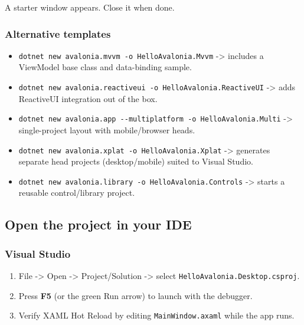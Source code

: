 A starter window appears. Close it when done.

\subsubsection{Alternative templates}\label{alternative-templates}

\begin{itemize}
\tightlist
\item
  \passthrough{\lstinline!dotnet new avalonia.mvvm -o HelloAvalonia.Mvvm!}
  -\textgreater{} includes a ViewModel base class and data-binding
  sample.
\item
  \passthrough{\lstinline!dotnet new avalonia.reactiveui -o HelloAvalonia.ReactiveUI!}
  -\textgreater{} adds ReactiveUI integration out of the box.
\item
  \passthrough{\lstinline!dotnet new avalonia.app --multiplatform -o HelloAvalonia.Multi!}
  -\textgreater{} single-project layout with mobile/browser heads.
\item
  \passthrough{\lstinline!dotnet new avalonia.xplat -o HelloAvalonia.Xplat!}
  -\textgreater{} generates separate head projects (desktop/mobile)
  suited to Visual Studio.
\item
  \passthrough{\lstinline!dotnet new avalonia.library -o HelloAvalonia.Controls!}
  -\textgreater{} starts a reusable control/library project.
\end{itemize}

\subsection{Open the project in your
IDE}\label{open-the-project-in-your-ide}

\subsubsection{Visual Studio}\label{visual-studio}

\begin{enumerate}
\def\labelenumi{\arabic{enumi}.}
\tightlist
\item
  File -\textgreater{} Open -\textgreater{} Project/Solution
  -\textgreater{} select
  \passthrough{\lstinline!HelloAvalonia.Desktop.csproj!}.
\item
  Press \textbf{F5} (or the green Run arrow) to launch with the
  debugger.
\item
  Verify XAML Hot Reload by editing
  \passthrough{\lstinline!MainWindow.axaml!} while the app runs.
\end{enumerate}

